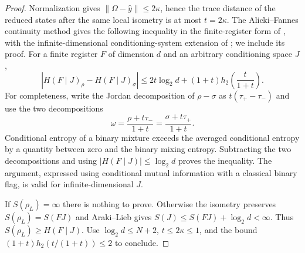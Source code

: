 \begin{proof}
Normalization gives $\|\Omega-\widehat y\|\le2\kappa$, hence the trace
distance of the reduced states after the same local isometry is at most
$t=2\kappa$. The Alicki--Fannes continuity method \cite{AF} gives the following inequality in the finite-register form of \cite[Lemma 2]{Winter}, with the infinite-dimensional conditioning-system extension of \cite{Kuznetsova}; we include its proof. For a finite register $F$ of dimension $d$ and an arbitrary
conditioning space $J$,
\[
 |H(F\mid J)_\rho-H(F\mid J)_\sigma|
 \le 2t\log_2d+(1+t)h_2\!\left(\frac{t}{1+t}\right).
\]
For completeness, write the Jordan decomposition of $\rho-\sigma$ as
$t(\tau_+-\tau_-)$ and use the two decompositions
\[
 \omega=\frac{\rho+t\tau_-}{1+t}
       =\frac{\sigma+t\tau_+}{1+t}.
\]
Conditional entropy of a binary mixture exceeds the averaged conditional
entropy by a quantity between zero and the binary mixing entropy.
Subtracting the two decompositions and using
$|H(F\mid J)|\le\log_2d$ proves the inequality. The argument, expressed
using conditional mutual information with a classical binary flag,
is valid for infinite-dimensional $J$.

If $S(\rho_L)=\infty$ there is nothing to prove. Otherwise the isometry
preserves $S(\rho_L)=S(FJ)$ and Araki--Lieb gives
$S(J)\le S(FJ)+\log_2d<\infty$. Thus $S(\rho_L)\ge H(F\mid J)$.
Use $\log_2d\le N+2$, $t\le2\kappa\le1$, and the bound
$(1+t)h_2(t/(1+t))\le2$ to conclude.
\end{proof}

